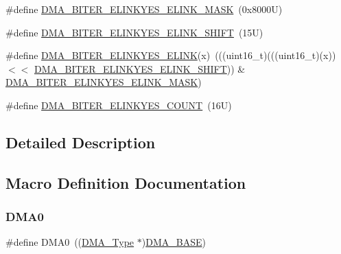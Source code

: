 \begin{DoxyCompactItemize}
\item 
\#define \mbox{\hyperlink{group___d_m_a___register___masks_ga778135a3df3e1f1696c74d53062dbe27}{D\+M\+A\+\_\+\+B\+I\+T\+E\+R\+\_\+\+E\+L\+I\+N\+K\+Y\+E\+S\+\_\+\+E\+L\+I\+N\+K\+\_\+\+M\+A\+SK}}~(0x8000\+U)
\item 
\#define \mbox{\hyperlink{group___d_m_a___register___masks_ga140716200d5f09b3f8819f8794444008}{D\+M\+A\+\_\+\+B\+I\+T\+E\+R\+\_\+\+E\+L\+I\+N\+K\+Y\+E\+S\+\_\+\+E\+L\+I\+N\+K\+\_\+\+S\+H\+I\+FT}}~(15\+U)
\item 
\#define \mbox{\hyperlink{group___d_m_a___register___masks_ga80d7b6ead1e9a1a3c5b285ce90e576be}{D\+M\+A\+\_\+\+B\+I\+T\+E\+R\+\_\+\+E\+L\+I\+N\+K\+Y\+E\+S\+\_\+\+E\+L\+I\+NK}}(x)~(((uint16\+\_\+t)(((uint16\+\_\+t)(x)) $<$$<$ \mbox{\hyperlink{group___d_m_a___register___masks_ga140716200d5f09b3f8819f8794444008}{D\+M\+A\+\_\+\+B\+I\+T\+E\+R\+\_\+\+E\+L\+I\+N\+K\+Y\+E\+S\+\_\+\+E\+L\+I\+N\+K\+\_\+\+S\+H\+I\+FT}})) \& \mbox{\hyperlink{group___d_m_a___register___masks_ga778135a3df3e1f1696c74d53062dbe27}{D\+M\+A\+\_\+\+B\+I\+T\+E\+R\+\_\+\+E\+L\+I\+N\+K\+Y\+E\+S\+\_\+\+E\+L\+I\+N\+K\+\_\+\+M\+A\+SK}})
\item 
\#define \mbox{\hyperlink{group___d_m_a___register___masks_ga6a30a92a497d06e87b4cd3551e3da009}{D\+M\+A\+\_\+\+B\+I\+T\+E\+R\+\_\+\+E\+L\+I\+N\+K\+Y\+E\+S\+\_\+\+C\+O\+U\+NT}}~(16\+U)
\end{DoxyCompactItemize}


\subsection{Detailed Description}


\subsection{Macro Definition Documentation}
\mbox{\label{group___d_m_a___register___masks_ga4103044f9ca209772f513dc694513ffb}} 
\subsubsection{\texorpdfstring{D\+M\+A0}{DMA0}}
{\footnotesize\ttfamily \#define D\+M\+A0~((\mbox{\hyperlink{struct_d_m_a___type}{D\+M\+A\+\_\+\+Type}} $\ast$)\mbox{\hyperlink{group___d_m_a___register___masks_gab04dd812f37907dc8bd6ed82e346b563}{D\+M\+A\+\_\+\+B\+A\+SE}})}


